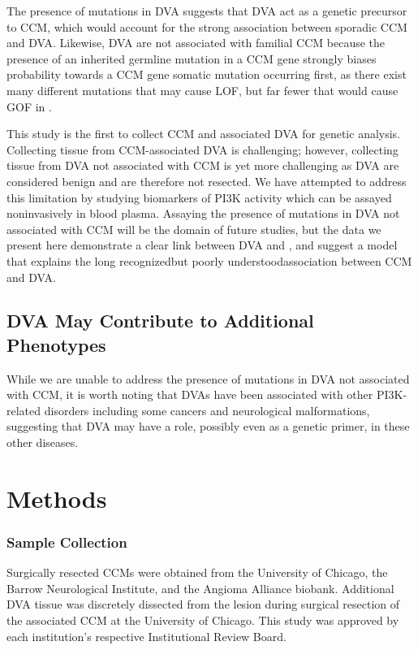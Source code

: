 The presence of  mutations in DVA suggests that DVA act as a genetic precursor to CCM, which would account for the strong association between sporadic CCM and DVA. Likewise, DVA are not associated with familial CCM because the presence of an inherited germline mutation in a CCM gene strongly biases probability towards a CCM gene somatic mutation occurring first, as there exist many different mutations that may cause LOF, but far fewer that would cause GOF in . 

This study is the first to collect CCM and associated DVA for genetic analysis. Collecting tissue from CCM-associated DVA is challenging; however, collecting tissue from DVA not associated with CCM is yet more challenging as DVA are considered benign and are therefore not resected. We have attempted to address this limitation by studying biomarkers of PI3K activity which can be assayed noninvasively in blood plasma. Assaying the presence of  mutations in DVA not associated with CCM will be the domain of future studies, but the data we present here demonstrate a clear link between DVA and , and suggest a model that explains the long recognized\textemdash but poorly understood\textemdash association between CCM and DVA. 

\subsection{DVA May Contribute to Additional Phenotypes}
While we are unable to address the presence of  mutations in DVA not associated with CCM, it is worth noting that DVAs have been associated with other PI3K-related disorders\citep{brinjikji2018, dhamija2018, rasalkar2010, roux2020, santucci2008, tan2007, ucler2019} including some cancers and neurological malformations, suggesting that DVA may have a role, possibly even as a genetic primer, in these other diseases. 



\section{Methods}
\subsubsection{Sample Collection}
	Surgically resected CCMs were obtained from the University of Chicago, the Barrow Neurological Institute, and the Angioma Alliance biobank. Additional DVA tissue was discretely dissected from the lesion during surgical resection of the associated CCM at the University of Chicago. This study was approved by each institution’s respective Institutional Review Board. 

